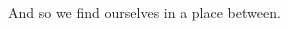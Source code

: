 \label{ally:15}
\begin{paracol}{2}
  \begin{leftcolumn}

\null
\vfill
\noindent And so we find ourselves in a place between.
\vfill
\newpage

\end{leftcolumn}
\end{paracol}
